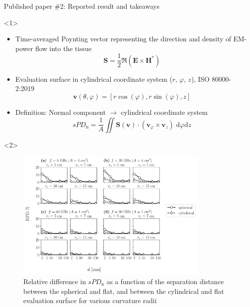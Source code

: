 \documentclass[xcolor=dvipsnames,10pt]{beamer}
\begin{document}
\begin{frame}{Published paper \#2: Reported result and takeaways}
    \begin{onlyenv}<1>
        \begin{itemize}
            \item Time-averaged Poynting vector representing the direction and density of EM-power flow into the tissue
            \begin{equation*}
                \mathbf{S} = \frac{1}{2} \Re \left( \mathbf{E} \times \mathbf{H}^{*} \right)
            \end{equation*}
            \item Evaluation surface in cylindrical coordinate system ($r$, $\varphi$, $z$), ISO 80000-2:2019
            \begin{equation*}
                \mathbf{v}(\theta, \varphi) = \left[r \cos(\varphi), r \sin(\varphi), z \right]
            \end{equation*}
            \item Definition: Normal component $\rightarrow$ cylindrical coordinate system
            \begin{equation*}
                sPD_\text{n} = \frac{1}{A} \iint \mathbf{S}(\mathbf{v}) \cdot \left( \mathbf{v}_\varphi \times \mathbf{v}_z \right) \; \mathrm{d}\varphi \mathrm{d}z
            \end{equation*}
        \end{itemize}
    \end{onlyenv}
    \begin{onlyenv}<2>
        \begin{figure}
            \centering
            \includegraphics[width=0.85\textwidth]{artwork/RPD-spdn.pdf}
            \caption{Relative difference in $sPD_\text{n}$ as a function of the separation distance between the spherical and flat, and between the cylindrical and flat  evaluation surface for various curvature radii}

\end{figure}
\end{onlyenv}
\end{frame}
\end{document}
